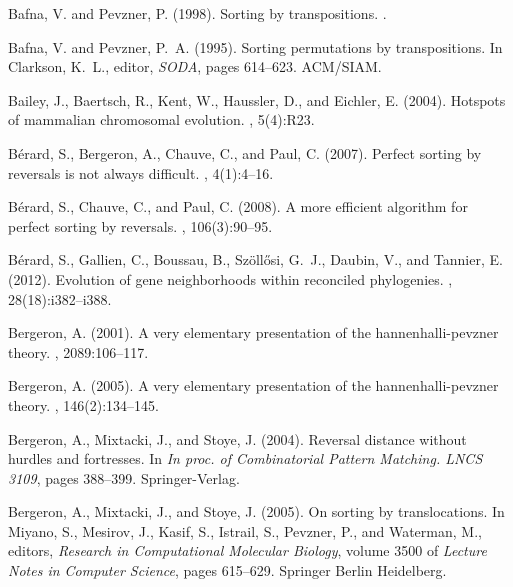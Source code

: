 \documentclass[11pt,final,twoside,nofrench]{thlifl}
\begin{document}
{\begin{thebibliography}{}
Bafna, V. and Pevzner, P. (1998).
\newblock Sorting by transpositions.
.

Bafna, V. and Pevzner, P.~A. (1995).
\newblock Sorting permutations by transpositions.
\newblock In Clarkson, K.~L., editor, {\em SODA}, pages 614--623. ACM/SIAM.

Bailey, J., Baertsch, R., Kent, W., Haussler, D., and Eichler, E. (2004).
\newblock Hotspots of mammalian chromosomal evolution.
, 5(4):R23.

B{\'e}rard, S., Bergeron, A., Chauve, C., and Paul, C. (2007).
\newblock Perfect sorting by reversals is not always difficult.
, 4(1):4--16.

B{\'e}rard, S., Chauve, C., and Paul, C. (2008).
\newblock A more efficient algorithm for perfect sorting by reversals.
, 106(3):90--95.

B{\'e}rard, S., Gallien, C., Boussau, B., Sz{\"o}ll{\H{o}}si, G.~J., Daubin,
  V., and Tannier, E. (2012).
\newblock Evolution of gene neighborhoods within reconciled phylogenies.
, 28(18):i382--i388.

Bergeron, A. (2001).
\newblock A very elementary presentation of the hannenhalli-pevzner theory.
, 2089:106--117.

Bergeron, A. (2005).
\newblock A very elementary presentation of the hannenhalli-pevzner theory.
, 146(2):134--145.

Bergeron, A., Mixtacki, J., and Stoye, J. (2004).
\newblock Reversal distance without hurdles and fortresses.
\newblock In {\em In proc. of Combinatorial Pattern Matching. LNCS 3109}, pages
  388--399. Springer-Verlag.

Bergeron, A., Mixtacki, J., and Stoye, J. (2005).
\newblock On sorting by translocations.
\newblock In Miyano, S., Mesirov, J., Kasif, S., Istrail, S., Pevzner, P., and
  Waterman, M., editors, {\em Research in Computational Molecular Biology},
  volume 3500 of {\em Lecture Notes in Computer Science}, pages 615--629.
  Springer Berlin Heidelberg.


\end{thebibliography}}
\end{document}
